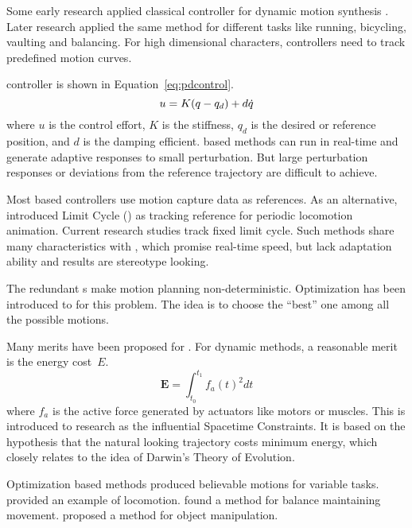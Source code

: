 \begin{itemize}




Some early research applied classical \pd controller for dynamic motion synthesis \citep{Raibert1991}.
Later research \citep{Hodgins1995} applied the same method for different tasks like running, bicycling, vaulting and balancing. 
For high dimensional characters, \pd controllers need to  track predefined motion curves\citep{Yin2007}.

\pd controller is shown in Equation~\ref{eq:pdcontrol}.
\begin{equation}
\label{eq:pdcontrol}
u=K(q -q_d)+d\dot{q}
\end{equation}
where $u$ is the control effort, $K$ is the stiffness, $q_d$ is the desired or reference position, and $d$ is the damping efficient.
\pd based methods can run in real-time and generate adaptive responses to small perturbation.
But large perturbation responses or deviations from the reference trajectory are difficult to achieve.


Most \pd based controllers use motion capture data as references.
As an alternative, \citet{Laszlo1996} introduced Limit Cycle (\lc) as tracking reference for periodic locomotion animation. 
Current research studies\citep{Coros2009,coros2010generalized,Laszlo1996} track fixed limit cycle.
Such methods share many characteristics with \pd, which promise real-time speed, but lack adaptation ability and results are stereotype looking.







The redundant \dof s make motion planning non-deterministic.
Optimization has been introduced to \cms for this problem.
The idea is to choose the ``best'' one among all the possible motions.

Many merits have been proposed for \cms.
For dynamic methods, a reasonable merit is the energy cost~$E$. 
\begin{equation}
 \textbf{E}=\int_{t_0}^{t_1}f_{a}(t)^2dt
\end{equation}
where $f_{a}$ is the active force generated by actuators like motors or muscles. 
This is introduced to \cms research as the influential Spacetime Constraints\citep{Witkin1988}. 
It is based on the hypothesis that the natural looking trajectory costs minimum energy,
which closely relates to the idea of Darwin's Theory of Evolution. 

Optimization based  methods produced believable motions for variable tasks. 
\citet{Jain2009} provided an example of locomotion.  
\citet{BalanceControl} found a method for balance maintaining movement. 
\citet{Liu2009} proposed a method for object manipulation. 
\end{itemize}



